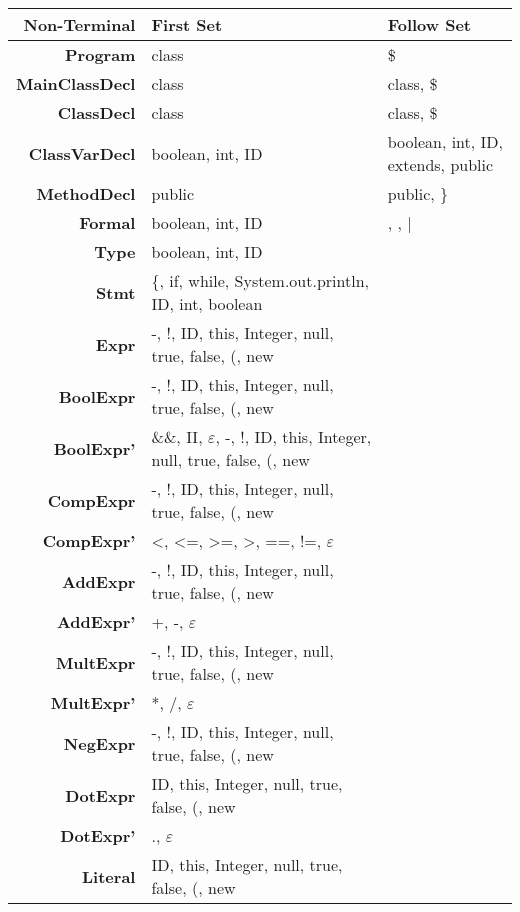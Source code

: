 \documentclass{report}
\begin{document}
%
\begin{tabularx}{\textwidth}{ r | R | R }

\textbf{Non-Terminal} & \textbf{First Set} & \textbf{Follow Set} \\
\hline
\textbf{Program} & class & \$ \\[1ex]
\textbf{MainClassDecl} & class & class, \$\\[1ex]
\textbf{ClassDecl} & class & class, \$\\[1ex] 
\textbf{ClassVarDecl} & boolean, int, ID & boolean, int, ID, extends, public \\[1ex]
\textbf{MethodDecl} & public & public, \}\\[1ex]
\textbf{Formal} & boolean, int, ID & , , |\\[1ex] 
\textbf{Type} & boolean, int, ID \\[1ex]
\textbf{Stmt} & \{, if, while, System.out.println, ID, int, boolean \\[1ex]
\textbf{Expr} & -, !, ID, this, Integer, null, true, false, (, new \\[1ex]
\textbf{BoolExpr} & -, !, ID, this, Integer, null, true, false, (, new \\[1ex]
\textbf{BoolExpr'} & \&\&, II, $\varepsilon$, -, !, ID, this, Integer, null, true, false, (, new \\[1ex]
\textbf{CompExpr} & -, !, ID, this, Integer, null, true, false, (, new \\[1ex]
\textbf{CompExpr'} & <, <=, >=, >, ==, !=, $\varepsilon$ \\[1ex]
\textbf{AddExpr} & -, !, ID, this, Integer, null, true, false, (, new \\[1ex]
\textbf{AddExpr'} & +, -, $\varepsilon$ \\[1ex]
\textbf{MultExpr} & -, !, ID, this, Integer, null, true, false, (, new \\[1ex]
\textbf{MultExpr'} & *, /, $\varepsilon$ \\[1ex]
\textbf{NegExpr} &  -, !, ID, this, Integer, null, true, false, (, new \\[1ex]
\textbf{DotExpr} & ID, this, Integer, null, true, false, (, new \\[1ex]
\textbf{DotExpr'} & ., $\varepsilon$ \\[1ex]
\textbf{Literal} & ID, this, Integer, null, true, false, (, new \\[1ex]


\end{tabularx}
\end{document}
